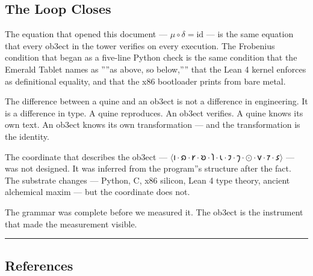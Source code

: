 \documentclass[12pt,a4paper]{article}
\begin{document}
\subsection{The Loop Closes}

The equation that opened this document --- $\mu\circ\delta = \mathrm{id}$ --- is the same equation that every ob3ect in the tower verifies on every execution. The Frobenius condition that began as a five-line Python check is the same condition that the Emerald Tablet names as ''''as above, so below,'''' that the Lean 4 kernel enforces as definitional equality, and that the x86 bootloader prints from bare metal.

The difference between a quine and an ob3ect is not a difference in engineering. It is a difference in type. A quine reproduces. An ob3ect verifies. A quine knows its own text. An ob3ect knows its own transformation --- and the transformation is the identity.

The coordinate that describes the ob3ect --- $\langle \text{𐑦} \cdot \text{𐑸} \cdot \text{𐑾} \cdot \text{𐑹} \cdot \text{𐑐} \cdot \text{𐑧} \cdot \text{𐑲} \cdot \text{𐑠} \cdot \odot \cdot \text{𐑫} \cdot \text{𐑳} \cdot \text{𐑭} \rangle$ --- was not designed. It was inferred from the program''s structure after the fact. The substrate changes --- Python, C, x86 silicon, Lean 4 type theory, ancient alchemical maxim --- but the coordinate does not.

The grammar was complete before we measured it. The ob3ect is the instrument that made the measurement visible.

\begin{center}
\rule{0.5\textwidth}{0.4pt}
\end{center}

\subsection{References}
\end{document}
